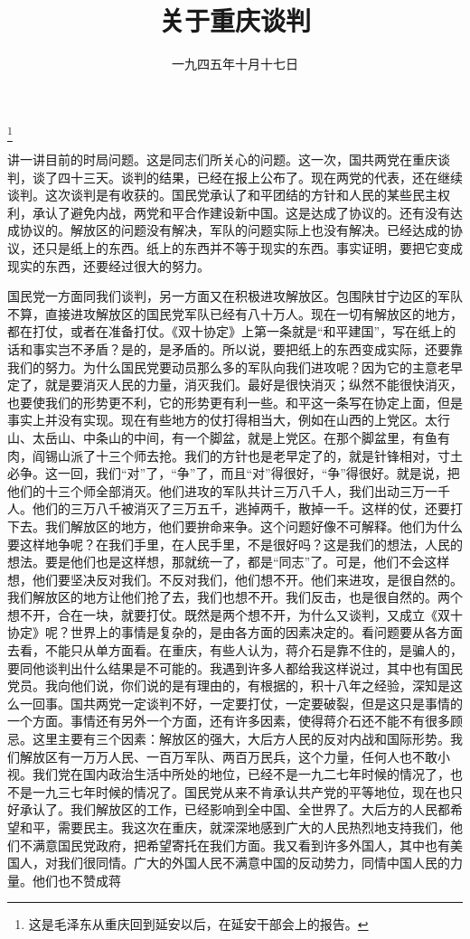 
\title{关于重庆谈判}
\date{一九四五年十月十七日}
\thanks{这是毛泽东从重庆回到延安以后，在延安干部会上的报告。}
\maketitle


讲一讲目前的时局问题。这是同志们所关心的问题。这一次，国共两党在重庆谈判，谈了四十三天。谈判的结果，已经在报上公布了。现在两党的代表，还在继续谈判。这次谈判是有收获的。国民党承认了和平团结的方针和人民的某些民主权利，承认了避免内战，两党和平合作建设新中国。这是达成了协议的。还有没有达成协议的。解放区的问题没有解决，军队的问题实际上也没有解决。已经达成的协议，还只是纸上的东西。纸上的东西并不等于现实的东西。事实证明，要把它变成现实的东西，还要经过很大的努力。

国民党一方面同我们谈判，另一方面又在积极进攻解放区。包围陕甘宁边区的军队不算，直接进攻解放区的国民党军队已经有八十万人。现在一切有解放区的地方，都在打仗，或者在准备打仗。《双十协定》上第一条就是“和平建国”，写在纸上的话和事实岂不矛盾？是的，是矛盾的。所以说，要把纸上的东西变成实际，还要靠我们的努力。为什么国民党要动员那么多的军队向我们进攻呢？因为它的主意老早定了，就是要消灭人民的力量，消灭我们。最好是很快消灭；纵然不能很快消灭，也要使我们的形势更不利，它的形势更有利一些。和平这一条写在协定上面，但是事实上并没有实现。现在有些地方的仗打得相当大，例如在山西的上党区。太行山、太岳山、中条山的中间，有一个脚盆，就是上党区。在那个脚盆里，有鱼有肉，阎锡山派了十三个师去抢。我们的方针也是老早定了的，就是针锋相对，寸土必争。这一回，我们“对”了，“争”了，而且“对”得很好，“争”得很好。就是说，把他们的十三个师全部消灭。他们进攻的军队共计三万八千人，我们出动三万一千人。他们的三万八千被消灭了三万五千，逃掉两千，散掉一千。这样的仗，还要打下去。我们解放区的地方，他们要拚命来争。这个问题好像不可解释。他们为什么要这样地争呢？在我们手里，在人民手里，不是很好吗？这是我们的想法，人民的想法。要是他们也是这样想，那就统一了，都是“同志”了。可是，他们不会这样想，他们要坚决反对我们。不反对我们，他们想不开。他们来进攻，是很自然的。我们解放区的地方让他们抢了去，我们也想不开。我们反击，也是很自然的。两个想不开，合在一块，就要打仗。既然是两个想不开，为什么又谈判，又成立《双十协定》呢？世界上的事情是复杂的，是由各方面的因素决定的。看问题要从各方面去看，不能只从单方面看。在重庆，有些人认为，蒋介石是靠不住的，是骗人的，要同他谈判出什么结果是不可能的。我遇到许多人都给我这样说过，其中也有国民党员。我向他们说，你们说的是有理由的，有根据的，积十八年之经验，深知是这么一回事。国共两党一定谈判不好，一定要打仗，一定要破裂，但是这只是事情的一个方面。事情还有另外一个方面，还有许多因素，使得蒋介石还不能不有很多顾忌。这里主要有三个因素：解放区的强大，大后方人民的反对内战和国际形势。我们解放区有一万万人民、一百万军队、两百万民兵，这个力量，任何人也不敢小视。我们党在国内政治生活中所处的地位，已经不是一九二七年时候的情况了，也不是一九三七年时候的情况了。国民党从来不肯承认共产党的平等地位，现在也只好承认了。我们解放区的工作，已经影响到全中国、全世界了。大后方的人民都希望和平，需要民主。我这次在重庆，就深深地感到广大的人民热烈地支持我们，他们不满意国民党政府，把希望寄托在我们方面。我又看到许多外国人，其中也有美国人，对我们很同情。广大的外国人民不满意中国的反动势力，同情中国人民的力量。他们也不赞成蒋